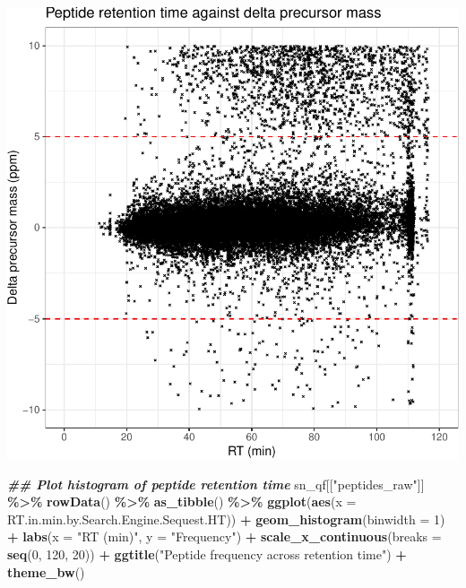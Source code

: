 \documentclass[9pt,a4paper,]{extarticle}
\newenvironment{Shaded}{\begin{snugshade}}{\end{snugshade}}
\newcommand{\AttributeTok}[1]{\textcolor[rgb]{0.13,0.29,0.53}{#1}}
\newcommand{\DecValTok}[1]{\textcolor[rgb]{0.00,0.00,0.81}{#1}}
\newcommand{\DocumentationTok}[1]{\textcolor[rgb]{0.56,0.35,0.01}{\textbf{\textit{#1}}}}
\newcommand{\FunctionTok}[1]{\textcolor[rgb]{0.13,0.29,0.53}{\textbf{#1}}}
\newcommand{\NormalTok}[1]{#1}
\newcommand{\SpecialCharTok}[1]{\textcolor[rgb]{0.81,0.36,0.00}{\textbf{#1}}}
\newcommand{\StringTok}[1]{\textcolor[rgb]{0.31,0.60,0.02}{#1}}
\begin{document}
\begin{center}\includegraphics[height=0.3\textheight]{workflow_expressions_files/figure-latex/lfq_mass_accuracy-1} \end{center}

\begin{Shaded}
\begin{Highlighting}[]
\DocumentationTok{\#\# Plot histogram of peptide retention time}
\NormalTok{sn\_qf[[}\StringTok{"peptides\_raw"}\NormalTok{]] }\SpecialCharTok{\%\textgreater{}\%}
  \FunctionTok{rowData}\NormalTok{() }\SpecialCharTok{\%\textgreater{}\%}
  \FunctionTok{as\_tibble}\NormalTok{() }\SpecialCharTok{\%\textgreater{}\%}
  \FunctionTok{ggplot}\NormalTok{(}\FunctionTok{aes}\NormalTok{(}\AttributeTok{x =}\NormalTok{ RT.in.min.by.Search.Engine.Sequest.HT)) }\SpecialCharTok{+}
  \FunctionTok{geom\_histogram}\NormalTok{(}\AttributeTok{binwidth =} \DecValTok{1}\NormalTok{) }\SpecialCharTok{+}
  \FunctionTok{labs}\NormalTok{(}\AttributeTok{x =} \StringTok{"RT (min)"}\NormalTok{, }\AttributeTok{y =} \StringTok{"Frequency"}\NormalTok{) }\SpecialCharTok{+}
  \FunctionTok{scale\_x\_continuous}\NormalTok{(}\AttributeTok{breaks =} \FunctionTok{seq}\NormalTok{(}\DecValTok{0}\NormalTok{, }\DecValTok{120}\NormalTok{, }\DecValTok{20}\NormalTok{)) }\SpecialCharTok{+}
  \FunctionTok{ggtitle}\NormalTok{(}\StringTok{"Peptide frequency across retention time"}\NormalTok{) }\SpecialCharTok{+}
  \FunctionTok{theme\_bw}\NormalTok{()}
\end{Highlighting}
\end{Shaded}
\end{document}
